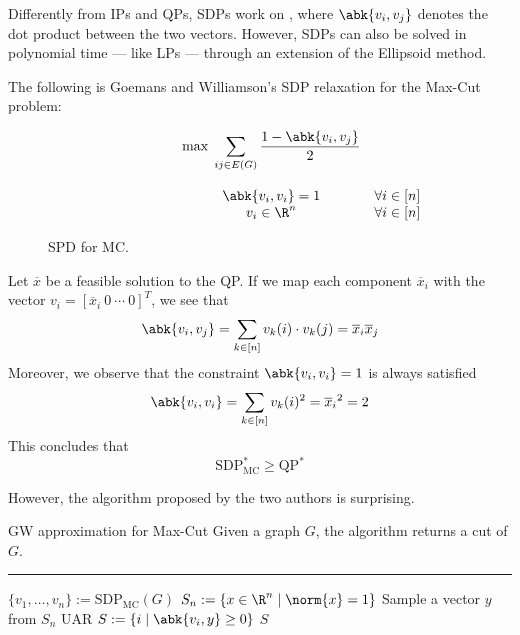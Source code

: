 \documentclass[a4paper, 12pt]{report}
\begin{document}
    Differently from IPs and QPs, SDPs work on , where $\abk{v_i, v_j}$ denotes the dot product between the two vectors. However, SDPs can also be solved in polynomial time --- like LPs --- through an extension of the Ellipsoid method.

    The following is Goemans and Williamson's SDP relaxation for the Max-Cut problem:

    \begin{figure}[H]
        \centering
        \[\begin{array}{ccl}
            \qquad\qquad\quad
            & \max \; \displaystyle \sum_{ij \in E(G)}{\dfrac{1 - \abk{v_i, v_j}}{2}} \\\\
            & \abk{v_i, v_i} = 1 & \forall i \in [n] \\
            & v_i \in \R^n & \forall i \in [n] \\
        \end{array}\]
        \caption{SPD for MC.}
    \end{figure}

    Let $\overline x$ be a feasible solution to the QP. If we map each component $\overline x_i$ with the vector $v_i = [\overline x_i \ 0 \ \cdots \ 0]^T$, we see that $$\abk{v_i, v_j} = \sum_{k \in [n]}{v_{k}(i) \cdot v_k(j)} = \overline x_i \overline x_j$$ Moreover, we observe that  the constraint $\abk{v_i, v_i} = 1$ is always satisfied $$\abk{v_i, v_i} = \sum_{k \in [n]}{v_k(i)^2} = {\overline x_i}^2 = 2$$ This concludes that $$\mathrm{SDP}^*_\mathrm{MC} \ge \mathrm{QP}^*$$

    However, the algorithm proposed by the two authors is  surprising.

    \begin{framedalgo}[label={gw algo}]{GW approximation for Max-Cut}
        Given a graph $G$, the algorithm returns a cut of $G$. \\
        \hrule

        \quad
        \begin{algorithmic}[1]
                \State $\{v_1, \ldots, v_n\} := \mathrm{SDP}_\mathrm{MC}(G)$
                \State $S_n := \{x \in \R^n \mid \norm{x} = 1\}$ 
                \State Sample a vector $y$ from $S_n$ UAR
                \State $S := \{i \mid \abk{v_i, y} \ge 0\}$
                \State {} $S$
            \EndFunction
        \end{algorithmic}
    \end{framedalgo}
\end{document}
